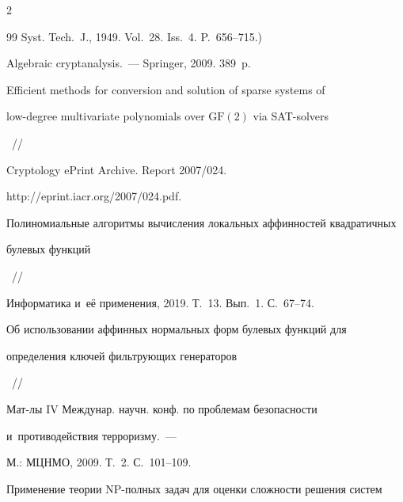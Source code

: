 \begin{multicols}{2}
{{\begin{thebibliography}{99}
Syst. Tech.~J., 1949. Vol.~28. Iss.~4. P.~656--715.)









        Algebraic cryptanalysis.~--- Springer, 2009. 389~p.









        {Efficient methods for conversion and solution of sparse systems of 


        low-degree multivariate polynomials over $\mathrm{GF}(2)$ via SAT-solvers}~//


        Cryptology ePrint Archive. Report 2007/024.


        {\sf http://eprint.iacr.org/2007/024.pdf}.









        {Полиномиальные алгоритмы вычисления локальных аффинностей квадратичных 


булевых функций}~//


        Информатика и~её применения, 2019. Т.~13. Вып.~1. С.~67--74.









        {Об использовании аффинных нормальных форм булевых функций для 


определения ключей фильтрующих генераторов}~//


        Мат-лы IV Междунар. научн. конф. по проблемам безопасности 


и~противодействия терроризму.~---


        М.: МЦНМО, 2009.  Т.~2. С.~101--109.









        {Применение теории NP-полных задач для оценки сложности решения систем 


}
\end{thebibliography}}}
\end{multicols}
